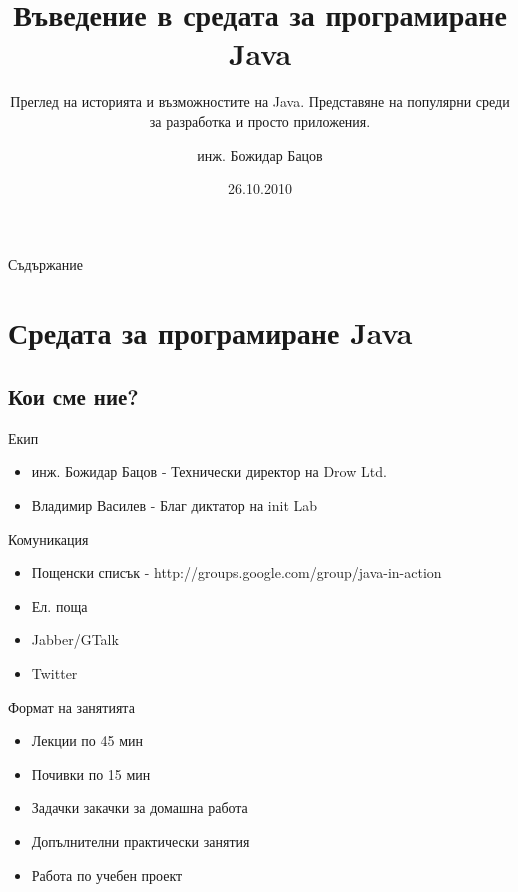 \documentclass{beamer}
\title{Въведение в средата за програмиране Java}
\subtitle{Преглед на историята и възможностите на Java. Представяне на
  популярни среди за разработка и просто приложения.}
\author{инж. Божидар Бацов}
\institute{Drow Ltd.}
\date{26.10.2010}
\begin{document}
\begin{frame}
  \titlepage
\end{frame}

\begin{frame}{Съдържание}
  \tableofcontents
\end{frame}




\section{Средата за програмиране Java}

\subsection[Кои сме ние?]{Кои сме ние?}

\begin{frame}{Екип}
  \begin{itemize}
  \item
    инж. Божидар Бацов - Технически директор на Drow Ltd.
  \item
    Владимир Василев - Благ диктатор на init Lab
  \end{itemize}
\end{frame}

\begin{frame}{Комуникация}
  \begin{itemize}
  \item Пощенски списък - http://groups.google.com/group/java-in-action
  \item Ел. поща
  \item Jabber/GTalk
  \item Twitter
  \end{itemize}
\end{frame}

\begin{frame}{Формат на занятията}
  \begin{itemize}
  \item Лекции по 45 мин
  \item Почивки по 15 мин
  \item Задачки закачки за домашна работа
  \item Допълнителни практически занятия
  \item Работа по учебен проект
  \end{itemize}
\end{frame}
\end{document}

